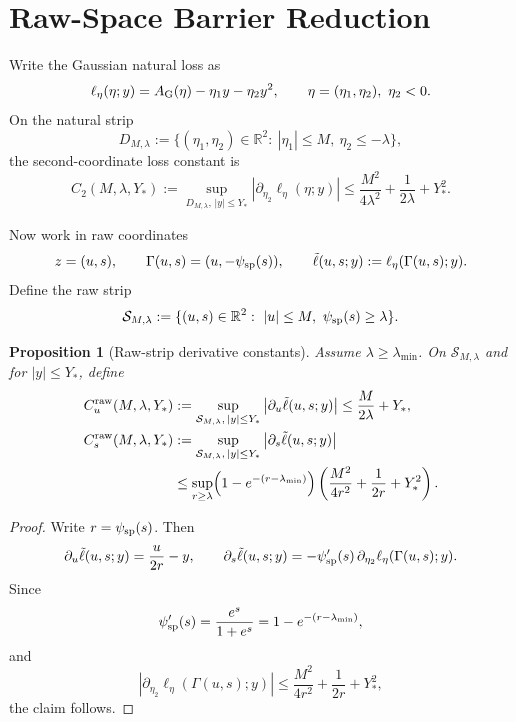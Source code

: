 \documentclass[11pt]{article}
\newtheorem{proposition}{Proposition}
\newcommand{\R}{\mathbb{R}}
\newcommand{\abs}[1]{\left\lvert #1 \right\rvert}
\begin{document}
\section{Raw-Space Barrier Reduction}

Write the Gaussian natural loss as
\[
  \ell_\eta(\eta;y)=A_{\rm G}(\eta)-\eta_1 y-\eta_2 y^2,
  \qquad
  \eta=(\eta_1,\eta_2),\ \eta_2<0.
\]
On the natural strip
\[
  D_{M,\lambda}
  :=
  \{(\eta_1,\eta_2)\in\R^2:\ |\eta_1|\le M,\ \eta_2\le-\lambda\},
\]
the second-coordinate loss constant is
\begin{equation}
  C_2(M,\lambda,Y_\ast)
  :=
  \sup_{D_{M,\lambda},\,|y|\le Y_\ast}
  \abs{\partial_{\eta_2}\ell_\eta(\eta;y)}
  \le
  \frac{M^2}{4\lambda^2}+\frac{1}{2\lambda}+Y_\ast^2.
  \label{eq:C2}
\end{equation}

Now work in raw coordinates
\[
  z=(u,s),
  \qquad
  \Gamma(u,s)=(u,-\psi_{\rm sp}(s)),
  \qquad
  \tilde\ell(u,s;y):=\ell_\eta(\Gamma(u,s);y).
\]
Define the raw strip
\[
  \mathcal S_{M,\lambda}
  :=
  \{(u,s)\in\R^2:\ |u|\le M,\ \psi_{\rm sp}(s)\ge \lambda\}.
\]

\begin{proposition}[Raw-strip derivative constants]
\label{prop:raw-strip-constants}
Assume $\lambda\ge \lambda_{\min}$. On $\mathcal S_{M,\lambda}$ and for
$|y|\le Y_\ast$, define
\begin{align}
  C_u^{\rm raw}(M,\lambda,Y_\ast)
  &:=
  \sup_{\mathcal S_{M,\lambda},\,|y|\le Y_\ast}
  \abs{\partial_u\tilde\ell(u,s;y)}
  \le
  \frac{M}{2\lambda}+Y_\ast,
  \label{eq:Cu-raw}
  \\
  C_s^{\rm raw}(M,\lambda,Y_\ast)
  &:=
  \sup_{\mathcal S_{M,\lambda},\,|y|\le Y_\ast}
  \abs{\partial_s\tilde\ell(u,s;y)}
  \nonumber\\
  &\le
  \sup_{r\ge \lambda}
  \Bigl(1-e^{-(r-\lambda_{\min})}\Bigr)
  \left(
    \frac{M^2}{4r^2}+\frac1{2r}+Y_\ast^2
  \right).
  \label{eq:Cs-raw}
\end{align}
\end{proposition}

\begin{proof}
Write $r=\psi_{\rm sp}(s)$. Then
\[
  \partial_u\tilde\ell(u,s;y)=\frac{u}{2r}-y,
  \qquad
  \partial_s\tilde\ell(u,s;y)
  =
  -\psi_{\rm sp}'(s)\,\partial_{\eta_2}\ell_\eta(\Gamma(u,s);y).
\]
Since
\[
  \psi_{\rm sp}'(s)
  =
  \frac{e^s}{1+e^s}
  =
  1-e^{-(r-\lambda_{\min})},
\]
and
\[
  \abs{\partial_{\eta_2}\ell_\eta(\Gamma(u,s);y)}
  \le
  \frac{M^2}{4r^2}+\frac1{2r}+Y_\ast^2,
\]
the claim follows.
\end{proof}
\end{document}
